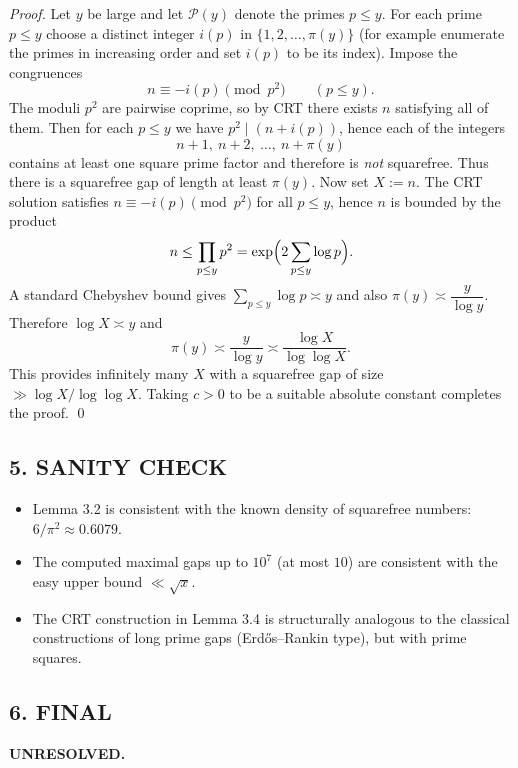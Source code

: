 \emph{Proof.}
Let $y$ be large and let $\mathcal{P}(y)$ denote the primes $p\le y$.
For each prime $p\le y$ choose a distinct integer $i(p)$ in $\{1,2,\dots,\pi(y)\}$ (for example enumerate the primes in increasing order and set $i(p)$ to be its index).
Impose the congruences
\[
 n\equiv -i(p) \pmod{p^2}\qquad (p\le y).
\]
The moduli $p^2$ are pairwise coprime, so by CRT there exists $n$ satisfying all of them.
Then for each $p\le y$ we have $p^2\mid (n+i(p))$, hence each of the integers
\[
 n+1,\ n+2,\ \dots,\ n+\pi(y)
\]
contains at least one square prime factor and therefore is \emph{not} squarefree.
Thus there is a squarefree gap of length at least $\pi(y)$.
Now set $X:=n$.
The CRT solution satisfies $n\equiv -i(p)\pmod{p^2}$ for all $p\le y$, hence $n$ is bounded by the product
\[
 n \le \prod_{p\le y} p^2 = \exp\Bigl(2\sum_{p\le y}\log p\Bigr).
\]
A standard Chebyshev bound gives $\sum_{p\le y}\log p \asymp y$ and also $\pi(y)\asymp \dfrac{y}{\log y}$.
Therefore $\log X\asymp y$ and
\[
\pi(y) \asymp \frac{y}{\log y} \asymp \frac{\log X}{\log\log X}.
\]
This provides infinitely many $X$ with a squarefree gap of size $\gg \log X/\log\log X$.
Taking $c>0$ to be a suitable absolute constant completes the proof. \qed

\subsection*{5. SANITY CHECK}
\begin{itemize}
\item Lemma 3.2 is consistent with the known density of squarefree numbers: $6/\pi^2\approx 0.6079$.
\item The computed maximal gaps up to $10^7$ (at most $10$) are consistent with the easy upper bound $\ll\sqrt{x}$.
\item The CRT construction in Lemma 3.4 is structurally analogous to the classical constructions of long prime gaps (Erd\H{o}s--Rankin type), but with prime squares.
\end{itemize}

\subsection*{6. FINAL}
\textbf{UNRESOLVED.}


